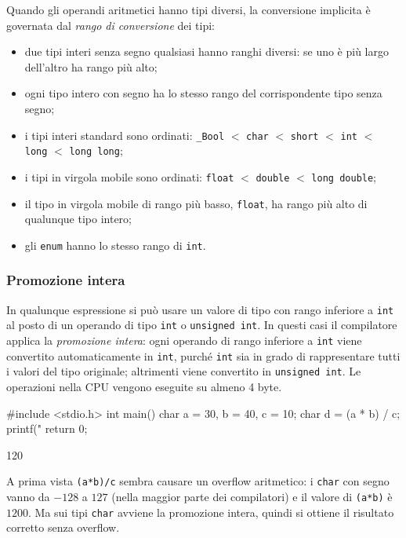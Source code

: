 \documentclass[11pt,a4paper]{article}
\begin{document}
Quando gli operandi aritmetici hanno tipi diversi, la conversione implicita è governata dal \emph{rango di conversione} dei tipi:
\begin{itemize}
    \item due tipi interi senza segno qualsiasi hanno ranghi diversi: se uno è più largo dell'altro ha rango più alto;
    \item ogni tipo intero con segno ha lo stesso rango del corrispondente tipo senza segno;
    \item i tipi interi standard sono ordinati: \lstinline|_Bool| $<$ \lstinline|char| $<$ \lstinline|short| $<$ \lstinline|int| $<$ \lstinline|long| $<$ \lstinline|long long|;
    \item i tipi in virgola mobile sono ordinati: \lstinline|float| $<$ \lstinline|double| $<$ \lstinline|long double|;
    \item il tipo in virgola mobile di rango più basso, \lstinline|float|, ha rango più alto di qualunque tipo intero;
    \item gli \lstinline|enum| hanno lo stesso rango di \lstinline|int|.
\end{itemize}

\subsubsection{Promozione intera}

In qualunque espressione si può usare un valore di tipo con rango inferiore a \lstinline|int| al posto di un operando di tipo \lstinline|int| o \lstinline|unsigned int|. In questi casi il compilatore applica la \emph{promozione intera}: ogni operando di rango inferiore a \lstinline|int| viene convertito automaticamente in \lstinline|int|, purché \lstinline|int| sia in grado di rappresentare tutti i valori del tipo originale; altrimenti viene convertito in \lstinline|unsigned int|. Le operazioni nella CPU vengono eseguite su almeno 4 byte.

\begin{esempio}
\begin{codice}
#include <stdio.h>
int main()
{
    char a = 30, b = 40, c = 10;
    char d = (a * b) / c;
    printf("%
    return 0;
}
\end{codice}
\begin{risultato}
120
\end{risultato}
A prima vista \lstinline|(a*b)/c| sembra causare un overflow aritmetico: i \lstinline|char| con segno vanno da $-128$ a $127$ (nella maggior parte dei compilatori) e il valore di \lstinline|(a*b)| è $1200$. Ma sui tipi \lstinline|char| avviene la promozione intera, quindi si ottiene il risultato corretto senza overflow.
\end{esempio}
\end{document}
